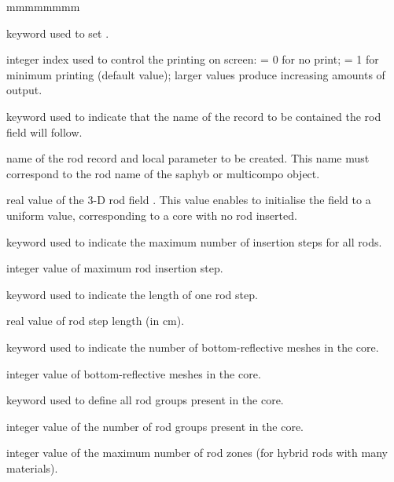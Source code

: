 \begin{ListeDeDescription}{mmmmmmmm}

\item[\moc{EDIT}] keyword used to set .

\item[\dusa{iprint}] integer index used to control the printing on screen:
 = 0 for no print; = 1 for minimum printing (default value); larger values
produce increasing amounts of output.

\item[\moc{PARA}] keyword used to indicate that the name of the record to be
contained the rod field will follow.

\item[\dusa{par1}] name of the rod record and local parameter to be created. This name must correspond to the rod name of the {\sc saphyb} or {\sc multicompo} object.

\item[\dusa{val1}] real value of the 3-D rod field . This value enables to initialise the field to a uniform value, corresponding to a core with no rod inserted.

\item[\moc{LINS}] keyword used to indicate the maximum number of insertion steps 
for all rods.

\item[\dusa{insm}] integer value of maximum rod insertion step.

\item[\moc{STEP}] keyword used to indicate the length of one rod step.

\item[\dusa{step}] real value of rod step length (in cm).

\item[\moc{NRFB}] keyword used to indicate the number of bottom-reflective meshes
in the core.

\item[\dusa{nrfb}] integer value of bottom-reflective meshes in the core.

\item[\moc{RGRP}] keyword used to define all rod groups present in the core.

\item[\dusa{ngrp}] integer value of the number of rod groups present in the core.

\item[\dusa{maxmix}] integer value of the maximum number of rod zones (for hybrid 
rods with many materials).


\end{ListeDeDescription}
